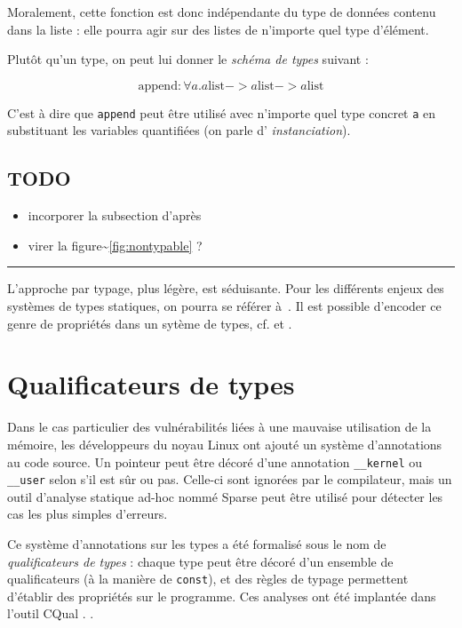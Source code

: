 Moralement, cette fonction est donc indépendante du type de données contenu dans
la liste : elle pourra agir sur des listes de n'importe quel type d'élément.

Plutôt qu'un type, on peut lui donner le \emph{schéma de types} suivant :

\[
  \textrm{append} : \forall a . a \textrm{list}
                             -> a \textrm{list}
                             -> a \textrm{list}
\]

C'est à dire que \texttt{append} peut être utilisé avec n'importe quel type
concret \texttt{a} en substituant les variables quantifiées (on parle d'
\emph{instanciation}).

\subsection*{TODO}

\begin{itemize}
\item
  incorporer la subsection d'après
\item
  virer la figure\textasciitilde{}\ref{fig:nontypable} ?
\end{itemize}

\begin{center}\rule{3in}{0.4pt}\end{center}

L'approche par typage, plus légère, est séduisante. Pour les différents enjeux
des systèmes de types statiques, on pourra se référer à~\cite{TAPL}. Il est
possible d'encoder ce genre de propriétés dans un sytème de types, cf.
\cite{lightweight-static-capabilities} et \cite{LZ06a}.

\section{Qualificateurs de types}

Dans le cas particulier des vulnérabilités liées à une mauvaise utilisation de
la mémoire, les développeurs du noyau Linux ont ajouté un système d'annotations
au code source. Un pointeur peut être décoré d'une annotation
\texttt{\_\_kernel} ou \texttt{\_\_user} selon s'il est sûr ou pas. Celle-ci
sont ignorées par le compilateur, mais un outil d'analyse statique ad-hoc nommé
Sparse  peut être utilisé pour détecter les cas les plus simples
d'erreurs.

Ce système d'annotations sur les types a été formalisé sous le nom de
\emph{qualificateurs de types} : chaque type peut être décoré d'un ensemble de
qualificateurs (à la manière de \texttt{const}), et des règles de typage
permettent d'établir des propriétés sur le programme. Ces analyses ont été
implantée dans l'outil CQual
\cite{pldi99,usenix01,pldi02,cquk-usenix04,toplas-quals}. .

